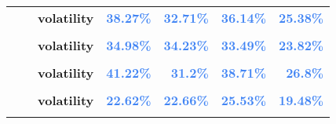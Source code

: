 \documentclass[
  authoryear,
  preprint,
  3p]{elsarticle}
\begin{document}
\begin{longtable}[t]{>{}l>{}l>{}l>{}r>{}r>{}r>{}r}
\textbf{} & \textbf{} & \textbf{volatility} & \textcolor[HTML]{4285f4}{\textbf{38.27\%}} & \textcolor[HTML]{4285f4}{\textbf{32.71\%}} & \textcolor[HTML]{4285f4}{\textbf{36.14\%}} & \textcolor[HTML]{4285f4}{\textbf{25.38\%}}\\
\textbf{\cellcolor{gray!10}{}} & \textbf{\cellcolor{gray!10}{backwardation}} & \textbf{\cellcolor{gray!10}{mean}} & \textcolor[HTML]{4285f4}{\textbf{\cellcolor{gray!10}{**49.79\%}}} & \textcolor[HTML]{4285f4}{\textbf{\cellcolor{gray!10}{24.47\%}}} & \textcolor[HTML]{4285f4}{\textbf{\cellcolor{gray!10}{30.01\%}}} & \textcolor[HTML]{4285f4}{\textbf{\cellcolor{gray!10}{**31.93\%}}}\\
\textbf{} & \textbf{} & \textbf{volatility} & \textcolor[HTML]{4285f4}{\textbf{34.98\%}} & \textcolor[HTML]{4285f4}{\textbf{34.23\%}} & \textcolor[HTML]{4285f4}{\textbf{33.49\%}} & \textcolor[HTML]{4285f4}{\textbf{23.82\%}}\\
\addlinespace
\textbf{\cellcolor{gray!10}{}} & \textbf{\cellcolor{gray!10}{contango}} & \textbf{\cellcolor{gray!10}{mean}} & \textcolor[HTML]{4285f4}{\textbf{\cellcolor{gray!10}{-30.19\%}}} & \textcolor[HTML]{4285f4}{\textbf{\cellcolor{gray!10}{-6.3\%}}} & \textcolor[HTML]{4285f4}{\textbf{\cellcolor{gray!10}{30.58\%}}} & \textcolor[HTML]{4285f4}{\textbf{\cellcolor{gray!10}{-4.88\%}}}\\
\textbf{} & \textbf{} & \textbf{volatility} & \textcolor[HTML]{4285f4}{\textbf{41.22\%}} & \textcolor[HTML]{4285f4}{\textbf{31.2\%}} & \textcolor[HTML]{4285f4}{\textbf{38.71\%}} & \textcolor[HTML]{4285f4}{\textbf{26.8\%}}\\
\textbf{\cellcolor{gray!10}{Platinum (XNYM)}} & \textbf{\cellcolor{gray!10}{whole period}} & \textbf{\cellcolor{gray!10}{mean}} & \textcolor[HTML]{4285f4}{\textbf{\cellcolor{gray!10}{12.93\%}}} & \textcolor[HTML]{4285f4}{\textbf{\cellcolor{gray!10}{10.56\%}}} & \textcolor[HTML]{4285f4}{\textbf{\cellcolor{gray!10}{7.29\%}}} & \textcolor[HTML]{4285f4}{\textbf{\cellcolor{gray!10}{-7.92\%}}}\\
\textbf{} & \textbf{} & \textbf{volatility} & \textcolor[HTML]{4285f4}{\textbf{22.62\%}} & \textcolor[HTML]{4285f4}{\textbf{22.66\%}} & \textcolor[HTML]{4285f4}{\textbf{25.53\%}} & \textcolor[HTML]{4285f4}{\textbf{19.48\%}}\\
\textbf{\cellcolor{gray!10}{}} & \textbf{\cellcolor{gray!10}{backwardation}} & \textbf{\cellcolor{gray!10}{mean}} & \textcolor[HTML]{4285f4}{\textbf{\cellcolor{gray!10}{**29.46\%}}} & \textcolor[HTML]{4285f4}{\textbf{\cellcolor{gray!10}{*25.07\%}}} & \textcolor[HTML]{4285f4}{\textbf{\cellcolor{gray!10}{10.46\%}}} & \textcolor[HTML]{4285f4}{\textbf{\cellcolor{gray!10}{1.17\%}}}\\

\end{longtable}
\end{document}
